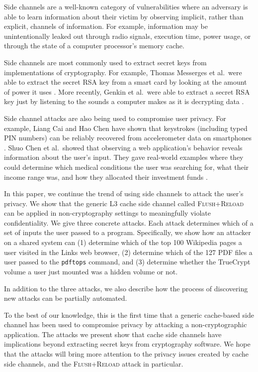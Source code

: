 \documentclass[letterpaper,twocolumn,10pt]{article}
\begin{document}
Side channels are a well-known category of vulnerabilities where an adversary is
able to learn information about their victim by observing implicit, rather than
explicit, channels of information. For example, information may be
unintentionally leaked out through radio signals, execution time, power usage,
or through the state of a computer processor's memory cache.

Side channels are most commonly used to extract secret keys from implementations
of cryptography. For example, Thomas Messerges et al.\ were able to extract the
secret RSA key from a smart card by looking at the amount of power it uses
\cite{messerges1999power}. More recently, Genkin et al.\ were able to extract
a secret RSA key just by listening to the sounds a computer makes as it is
decrypting data \cite{genkin2013rsa}. 

Side channel attacks are also being used to compromise user privacy. For
example, Liang Cai and Hao Chen have shown that keystrokes (including typed PIN
numbers) can be reliably recovered from accelerometer data on smartphones
\cite{cai2012practicality}. Shuo Chen et al.\ showed that observing a web
application's behavior reveals information about the user's input. They gave
real-world examples where they could determine which medical conditions the user
was searching for, what their income range was, and how they allocated their
investment funds \cite{chen2010side}.

In this paper, we continue the trend of using side channels to attack the user's
privacy. We show that the generic L3 cache side channel called
\textsc{Flush+Reload} \cite{yarom2013flush} can be applied in non-cryptography
settings to meaningfully violate confidentiality. We give three concrete
attacks. Each attack determines which of a set of inputs the user passed to
a program. Specifically, we show how an attacker on a shared system can (1)
determine which of the top 100 Wikipedia pages a user visited in the Links web
browser, (2) determine which of the 127 PDF files a user passed to the
\texttt{pdftops} command, and (3) determine whether the TrueCrypt volume a user
just mounted was a hidden volume or not.

In addition to the three attacks, we also describe how the process of
discovering new attacks can be partially automated.

To the best of our knowledge, this is the first time that a generic cache-based
side channel has been used to compromise privacy by attacking
a non-cryptographic application. The attacks we present show that cache side
channels have implications beyond extracting secret keys from cryptography
software. We hope that the attacks will bring more attention to the privacy
issues created by cache side channels, and the \textsc{Flush+Reload} attack in
particular.
\end{document}
